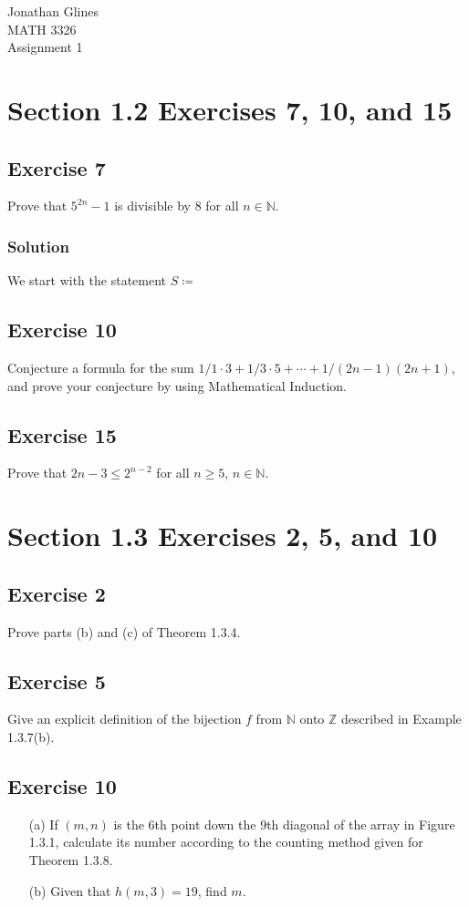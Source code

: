 \documentclass[12pt]{article}
\begin{document}
\begin{flushright}
{\Large
Jonathan Glines \\
MATH 3326 \\
Assignment 1 \\
}
\end{flushright}
\section*{Section 1.2 Exercises 7, 10, and 15}
\subsection*{Exercise 7}
Prove that $5^{2n} - 1$ is divisible by 8 for all $n \in \mathbb{N}$.
\subsubsection*{Solution}
We start with the statement $S \coloneqq $
\subsection*{Exercise 10}
Conjecture a formula for the sum $1/1\cdot 3 + 1/3 \cdot 5 + \cdots + 1 / \left(2n - 1\right)\left(2n+1\right)$, and prove your conjecture by using Mathematical Induction.
\subsection*{Exercise 15}
Prove that $2n - 3 \leq 2^{n-2}$ for all $n \geq 5$, $n \in \mathbb{N}$.
\section*{Section 1.3 Exercises 2, 5, and 10}
\subsection*{Exercise 2}
Prove parts (b) and (c) of Theorem 1.3.4.
\subsection*{Exercise 5}
Give an explicit definition of the bijection $f$ from $\mathbb{N}$ onto $\mathbb{Z}$ described in Example 1.3.7(b).
\subsection*{Exercise 10}
\begin{itemize}
\item[(a)] If $\left(m, n\right)$ is the 6th point down the 9th diagonal of the array in Figure 1.3.1, calculate its number according to the counting method given for Theorem 1.3.8.
\item[(b)] Given that $h\left(m, 3\right) = 19$, find $m$.
\end{itemize}
\end{document}
